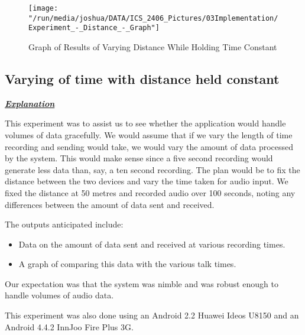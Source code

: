 \documentclass[12pt,svgnames,smaller]{article} %
\begin{document}
	\begin{figure}
		\centering
		\texttt{[image: "/run/media/joshua/DATA/ICS\_2406\_Pictures/03Implementation/Experiment\_-\_Distance\_-\_Graph"]}
		\caption{Graph of Results of Varying Distance While Holding Time Constant}
		\label{fig:Implementation-Figure18}			
	\end{figure} 
	
	

	\subsection{\textbf{Varying of time with distance held constant}}
	
	\textbf{\textit{\underline{Explanation}}}
	
	This experiment was to assist us to see whether the application would handle volumes of data gracefully. We would assume that if we vary the length of time recording and sending would take, we would vary the amount of data processed by the system. This would make sense since a five second recording would generate less data than, say, a ten second recording.
	The plan would be to fix the distance between the two devices and vary the time taken for audio input. We fixed the distance at 50 metres and recorded audio over 100 seconds, noting any differences between the amount of data sent and received.
	
	The outputs anticipated include:
	
	\begin{itemize}
		\item Data on the amount of data sent and received at various recording times.
		\item A graph of comparing this data with the various talk times.
	\end{itemize}
	
	Our expectation was that the system was nimble and was robust enough to handle volumes of audio data.
	
	This experiment was also done using an Android 2.2 Huawei Ideos U8150 and an Android 4.4.2 InnJoo Fire Plus 3G.
	
\end{document}
